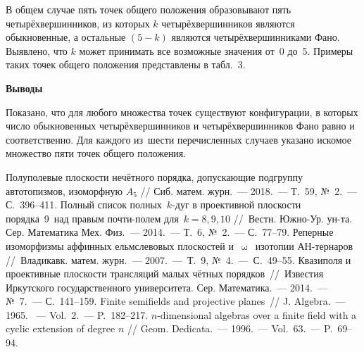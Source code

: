 В общем случае пять точек общего положения образовывают пять  четырёхвершинников, из которых $k$ четырёхвершинников являются обыкновенные, а остальные $(5-k)$ являются четырёхвершинниками Фано. Выявлено, что $k$ может принимать все возможные значения от~0 до~5. Примеры таких точек общего положения представлены в табл.~3.



\clearpage
\textbf{Выводы}

Показано, что для любого множества точек существуют конфигурации, в которых число обыкновенных четырёхвершинников и четырёхвершинников Фано равно и
соответственно. Для каждого из~шести перечисленных случаев указано искомое множество пяти точек общего положения.




\begin{thebibliography}{99}

\bibitem{} Полуполевые плоскости нечётного порядка, допускающие подгруппу автотопизмов, изоморфную $A_5$ // Сиб. матем. журн.~--- 2018.~--- Т.~59, №~2.~--- С.~396--411.
\bibitem{} Полный список полных $k$-дуг в проективной плоскости порядка 9 над правым почти-полем для $k=8, 9, 10$ // Вестн. Южно-Ур. ун-та. Сер. Математика Мех. Физ.~--- 2014.~--- Т.~6, №~2.~--- С.~77--79.
\bibitem{} Реперные изоморфизмы аффинных ельмслевовых плоскостей и $\upomega$ изотопии АН-тернаров // Владикавк. матем. журн.~--- 2007.~--- Т.~9, №~4.~--- С.~49--55.
\bibitem{} Квазиполя и проективные плоскости трансляций малых чётных порядков~// Известия Иркутского государственного университета. Сер. Математика.~--- 2014.~--- №~7.~--- С.~141--159.
\bibitem{} Finite semifields and projective planes~// J. Algebra.~--- 1965. ~--- Vol.~2.~--- P.~182--217.
\bibitem{} $n$-dimensional algebras over a finite field with a cyclic extension of degree $n$ // Geom. Dedicata.~--- 1996.~--- Vol.~63.~--- P.~69--94.


\end{thebibliography}
